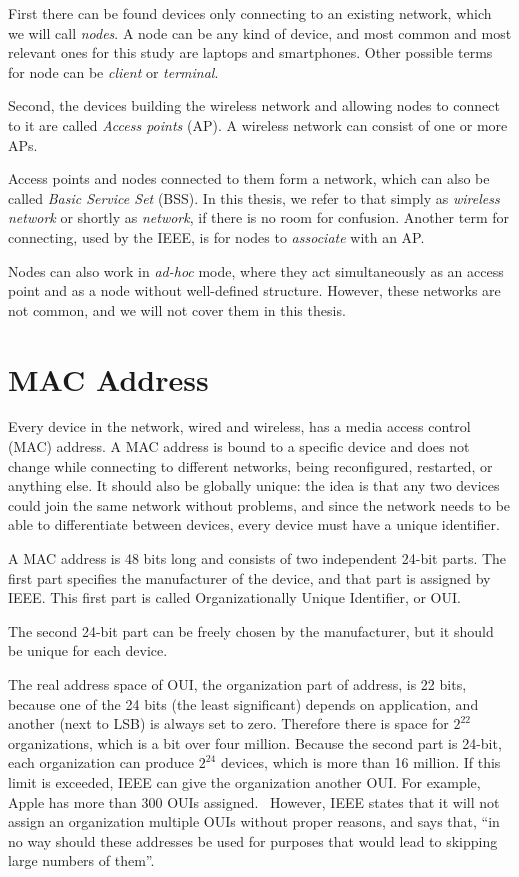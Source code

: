 \documentclass[12pt,a4paper,oneside,pdftex]{report}
\begin{document}
First there can be found devices only connecting to an existing network, which we will call \emph{nodes}. A node can be any kind of device, and most common and most relevant ones for this study are laptops and smartphones. Other possible terms for node can be \emph{client} or \emph{terminal}.

Second, the devices building the wireless network and allowing nodes to connect to it are called \emph{Access points} (AP). A wireless network can consist of one or more APs.

Access points and nodes connected to them form a network, which can also be called \emph{Basic Service Set} (BSS). In this thesis, we refer to that simply as \emph{wireless network} or shortly as \emph{network}, if there is no room for confusion. Another term for connecting, used by the IEEE, is for nodes to \emph{associate} with an AP.

Nodes can also work in \emph{ad-hoc} mode, where they act simultaneously as an access point and as a node without well-defined structure. However, these networks are not common, and we will not cover them in this thesis.


\section{MAC Address}
\label{sec:MAC}

Every device in the network, wired and wireless, has a media access control (MAC) address. A MAC address is bound to a specific device and does not change while connecting to different networks, being reconfigured, restarted, or anything else. It should also be globally unique: the idea is that any two devices could join the same network without problems, and since the network needs to be able to differentiate between devices, every device must have a unique identifier.~\cite{802_overview}

A MAC address is 48 bits long and consists of two independent 24-bit parts. The first part specifies the manufacturer of the device, and that part is assigned by IEEE. This first part is called Organizationally Unique Identifier, or OUI.

The second 24-bit part can be freely chosen by the manufacturer, but it should be unique for each device. 

The real address space of OUI, the organization part of address, is 22 bits, because one of the 24 bits (the least significant) depends on application, and another (next to LSB) is always set to zero. Therefore there is space for $2^{22}$ organizations, which is a bit over four million. Because the second part is 24-bit, each organization can produce $2^{24}$ devices, which is more than 16 million. If this limit is exceeded, IEEE can give the organization another OUI. For example, Apple has more than 300 OUIs assigned.~\cite{oui_listing} However, IEEE states that it will not assign an organization multiple OUIs without proper reasons, and says that, ``in no way should these addresses be used for purposes that would lead to skipping large numbers of them''.~\cite{802_overview} 
\end{document}
